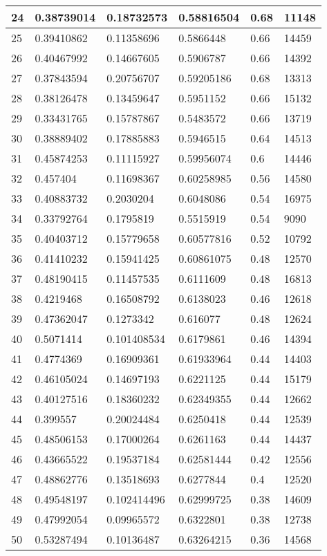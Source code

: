 \begin{longtable}{|l|l|l|l|l|l|}
24 & 0.38739014 & 0.18732573 & 0.58816504 & 0.68 & 11148 \\ \hline 
25 & 0.39410862 & 0.11358696 & 0.5866448 & 0.66 & 14459 \\ \hline 
26 & 0.40467992 & 0.14667605 & 0.5906787 & 0.66 & 14392 \\ \hline 
27 & 0.37843594 & 0.20756707 & 0.59205186 & 0.68 & 13313 \\ \hline 
28 & 0.38126478 & 0.13459647 & 0.5951152 & 0.66 & 15132 \\ \hline 
29 & 0.33431765 & 0.15787867 & 0.5483572 & 0.66 & 13719 \\ \hline 
30 & 0.38889402 & 0.17885883 & 0.5946515 & 0.64 & 14513 \\ \hline 
31 & 0.45874253 & 0.11115927 & 0.59956074 & 0.6 & 14446 \\ \hline 
32 & 0.457404 & 0.11698367 & 0.60258985 & 0.56 & 14580 \\ \hline 
33 & 0.40883732 & 0.2030204 & 0.6048086 & 0.54 & 16975 \\ \hline 
34 & 0.33792764 & 0.1795819 & 0.5515919 & 0.54 & 9090 \\ \hline 
35 & 0.40403712 & 0.15779658 & 0.60577816 & 0.52 & 10792 \\ \hline 
36 & 0.41410232 & 0.15941425 & 0.60861075 & 0.48 & 12570 \\ \hline 
37 & 0.48190415 & 0.11457535 & 0.6111609 & 0.48 & 16813 \\ \hline 
38 & 0.4219468 & 0.16508792 & 0.6138023 & 0.46 & 12618 \\ \hline 
39 & 0.47362047 & 0.1273342 & 0.616077 & 0.48 & 12624 \\ \hline 
40 & 0.5071414 & 0.101408534 & 0.6179861 & 0.46 & 14394 \\ \hline 
41 & 0.4774369 & 0.16909361 & 0.61933964 & 0.44 & 14403 \\ \hline 
42 & 0.46105024 & 0.14697193 & 0.6221125 & 0.44 & 15179 \\ \hline 
43 & 0.40127516 & 0.18360232 & 0.62349355 & 0.44 & 12662 \\ \hline 
44 & 0.399557 & 0.20024484 & 0.6250418 & 0.44 & 12539 \\ \hline 
45 & 0.48506153 & 0.17000264 & 0.6261163 & 0.44 & 14437 \\ \hline 
46 & 0.43665522 & 0.19537184 & 0.62581444 & 0.42 & 12556 \\ \hline 
47 & 0.48862776 & 0.13518693 & 0.6277844 & 0.4 & 12520 \\ \hline 
48 & 0.49548197 & 0.102414496 & 0.62999725 & 0.38 & 14609 \\ \hline 
49 & 0.47992054 & 0.09965572 & 0.6322801 & 0.38 & 12738 \\ \hline 
50 & 0.53287494 & 0.10136487 & 0.63264215 & 0.36 & 14568 \\ \hline 
\end{longtable}